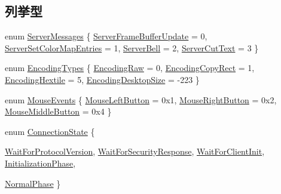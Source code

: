 \subsection*{列挙型}
\begin{DoxyCompactItemize}
\item 
enum \hyperlink{group__VncConstants_ga98f897c5a38e76e2cc7fea4d87083a84}{ServerMessages} \{ \hyperlink{group__VncConstants_gga98f897c5a38e76e2cc7fea4d87083a84afb5f87db0a4610309f486463de5388b7}{ServerFrameBufferUpdate} =  0, 
\hyperlink{group__VncConstants_gga98f897c5a38e76e2cc7fea4d87083a84aba175e2ce5c7225c9945f1e133857c07}{ServerSetColorMapEntries} =  1, 
\hyperlink{group__VncConstants_gga98f897c5a38e76e2cc7fea4d87083a84a32aadc1d2674e65c0f598a2727945b8d}{ServerBell} =  2, 
\hyperlink{group__VncConstants_gga98f897c5a38e76e2cc7fea4d87083a84ad80502eb07cc53ade0e84460d0c39e7c}{ServerCutText} =  3
 \}
\item 
enum \hyperlink{group__VncConstants_ga0b9039f87c8a2980c4a6ab14b511760a}{EncodingTypes} \{ \hyperlink{group__VncConstants_gga0b9039f87c8a2980c4a6ab14b511760aa2929e8976a78e5a5e8829beae2a7e69e}{EncodingRaw} =  0, 
\hyperlink{group__VncConstants_gga0b9039f87c8a2980c4a6ab14b511760aac66141a54bb407b18d3ab26e779bc4a8}{EncodingCopyRect} =  1, 
\hyperlink{group__VncConstants_gga0b9039f87c8a2980c4a6ab14b511760aa2e2676a7c0aac5891c51c5d4325453f7}{EncodingHextile} =  5, 
\hyperlink{group__VncConstants_gga0b9039f87c8a2980c4a6ab14b511760aa81cbe670fb7e962f4721e74d55bc66e5}{EncodingDesktopSize} =  -\/223
 \}
\item 
enum \hyperlink{group__VncConstants_ga0aa77c5c19bd1f953c90f0cae8c61a9a}{MouseEvents} \{ \hyperlink{group__VncConstants_gga0aa77c5c19bd1f953c90f0cae8c61a9aa13ee718768549ed254378457536bfd63}{MouseLeftButton} =  0x1, 
\hyperlink{group__VncConstants_gga0aa77c5c19bd1f953c90f0cae8c61a9aa9722dcc9b50f713f587a1b046e108b27}{MouseRightButton} =  0x2, 
\hyperlink{group__VncConstants_gga0aa77c5c19bd1f953c90f0cae8c61a9aaa93c27c34acd42cdc9e28a8f668d87dd}{MouseMiddleButton} =  0x4
 \}
\item 
enum \hyperlink{group__VncConstants_gacdd867d72142510ce53521a63a062f9b}{ConnectionState} \{ \par
\hyperlink{group__VncConstants_ggacdd867d72142510ce53521a63a062f9ba79cc83bc90b4f683fb2495d4487662ea}{WaitForProtocolVersion}, 
\hyperlink{group__VncConstants_ggacdd867d72142510ce53521a63a062f9ba198ea2412a93ac253bf8e4406a8fb06c}{WaitForSecurityResponse}, 
\hyperlink{group__VncConstants_ggacdd867d72142510ce53521a63a062f9ba78e807adbaddb74b84dea34150fab20e}{WaitForClientInit}, 
\hyperlink{group__VncConstants_ggacdd867d72142510ce53521a63a062f9badd4438c090c589c90c368d163c4edbd9}{InitializationPhase}, 
\par
\hyperlink{group__VncConstants_ggacdd867d72142510ce53521a63a062f9ba6302b1455052baff1528e67e95db429a}{NormalPhase}
 \}
\end{DoxyCompactItemize}
